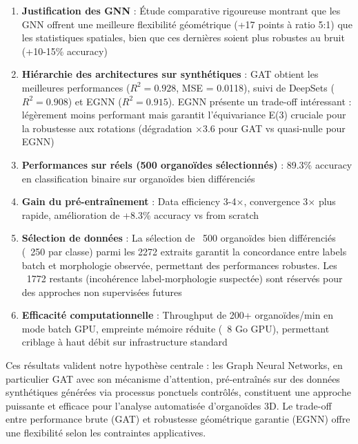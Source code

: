 \begin{enumerate}
    \item \textbf{Justification des GNN} : Étude comparative rigoureuse montrant que les GNN offrent une meilleure flexibilité géométrique (+17 points à ratio 5:1) que les statistiques spatiales, bien que ces dernières soient plus robustes au bruit (+10-15\% accuracy)
    
    \item \textbf{Hiérarchie des architectures sur synthétiques} : GAT obtient les meilleures performances ($R^2 = 0.928$, MSE = 0.0118), suivi de DeepSets ($R^2 = 0.908$) et EGNN ($R^2 = 0.915$). EGNN présente un trade-off intéressant : légèrement moins performant mais garantit l'équivariance E(3) cruciale pour la robustesse aux rotations (dégradation ×3.6 pour GAT vs quasi-nulle pour EGNN)

    \item \textbf{Performances sur réels (500 organoïdes sélectionnés)} : 89.3\% accuracy en classification binaire sur organoïdes bien différenciés
    
    \item \textbf{Gain du pré-entraînement} : Data efficiency 3-4×, convergence 3× plus rapide, amélioration de +8.3\% accuracy vs from scratch
    
    \item \textbf{Sélection de données} : La sélection de ~500 organoïdes bien différenciés (~250 par classe) parmi les 2272 extraits garantit la concordance entre labels batch et morphologie observée, permettant des performances robustes. Les ~1772 restants (incohérence label-morphologie suspectée) sont réservés pour des approches non supervisées futures
    
    \item \textbf{Efficacité computationnelle} : Throughput de 200+ organoïdes/min en mode batch GPU, empreinte mémoire réduite (~8 Go GPU), permettant criblage à haut débit sur infrastructure standard
\end{enumerate}

Ces résultats valident notre hypothèse centrale : les Graph Neural Networks, en particulier GAT avec son mécanisme d'attention, pré-entraînés sur des données synthétiques générées via processus ponctuels contrôlés, constituent une approche puissante et efficace pour l'analyse automatisée d'organoïdes 3D. Le trade-off entre performance brute (GAT) et robustesse géométrique garantie (EGNN) offre une flexibilité selon les contraintes applicatives.
